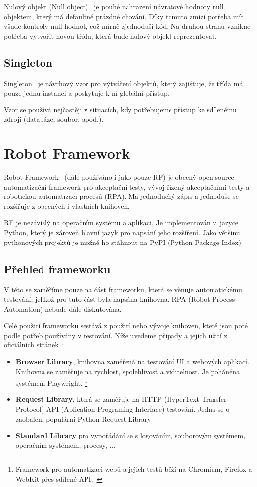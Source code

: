 Nulový objekt (Null object)~\cite{NullObject} je pouhé nahrazení návratové hodnoty null objektem, který má defaultně prázdné chování. Díky tomuto zmizí potřeba mít všude kontroly null hodnot, což mírně zjednoduší kód. Na druhou stranu vznikne potřeba vytvořit novou třídu, která bude nulový objekt reprezentovat.

\subsection{Singleton}
\label{singleton}

Singleton~\cite{Singleton} je návrhový vzor pro výtváření objektů, který zajišťuje, že třída má pouze jednu instanci a poskytuje k ní globální přístup.

Vzor se používá nejčastěji v situacích, kdy potřebujeme přístup ke sdílenému zdroji (databáze, soubor, apod.).

\section{Robot Framework}
\label{sec:RF}

Robot Framework~\cite{robotframeworkGH} (dále používáno i jako pouze RF) je obecný open-source automatizační framework pro akceptační testy, vývoj řízený akceptačními testy a robotickou automatizaci procesů (RPA). Má jednoduchý zápis a jednoduše se rozšiřuje z obecných i vlastních knihoven.

RF je nezávislý na operačním systému a aplikaci. Je implementován v~jazyce Python, který je zároveň hlavní jazyk pro napsání jeho rozšíření. Jako většinu pythonových projektů je možné ho stáhnout na PyPI (Python Package Index)

\subsection{Přehled frameworku}

V této se zaměříme pouze na část frameworku, která se věnuje automatickému testování, jelikož pro tuto část byla napsána knihovna. RPA (Robot Process Automation) nebude dále diskutována.

Celé použití frameworku sestává z použití nebo vývoje knihoven, které jsou poté podle potřeb používány v testování. Níže uvedeme případy a jejich užití z oficiálních stránek~\cite{robotframeworkOverview}: 

\begin{itemize}
    \item \textbf{Browser Library}, knihovna zaměřená na testování UI a webových aplikací. Knihovna se zaměřuje na rychlost, spolehlivost a viditelnost. Je poháněna systémem Playwright. \footnote{Framework pro automatizaci webů a jejich testů běží na Chromium, Firefox a WebKit přes sdílené API.~\cite{PlaywrightGH}}
    \item \textbf{Request Library}, která se zaměřuje na HTTP (HyperText Transfer Protocol) API (Aplication Programing Interface) testování. Jedná se o zaobalení populární Python Request Library
    \item \textbf{Standard Library} pro vypořádání se s logováním, souborovým systémem, operačním systémem, procesy, ...
\end{itemize}

